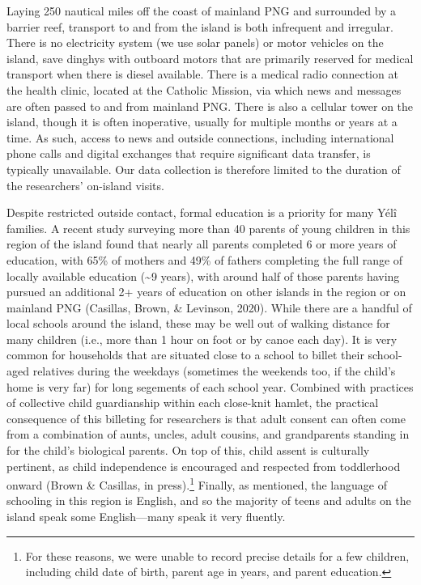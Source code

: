 \documentclass[english,,man,floatsintext]{apa6}
\begin{document}
Laying 250 nautical miles off the coast of mainland PNG and surrounded
by a barrier reef, transport to and from the island is both infrequent
and irregular. There is no electricity system (we use solar panels) or
motor vehicles on the island, save dinghys with outboard motors that are
primarily reserved for medical transport when there is diesel available.
There is a medical radio connection at the health clinic, located at the
Catholic Mission, via which news and messages are often passed to and
from mainland PNG. There is also a cellular tower on the island, though
it is often inoperative, usually for multiple months or years at a time.
As such, access to news and outside connections, including international
phone calls and digital exchanges that require significant data
transfer, is typically unavailable. Our data collection is therefore
limited to the duration of the researchers' on-island visits.

Despite restricted outside contact, formal education is a priority for
many Yélî families. A recent study surveying more than 40 parents of
young children in this region of the island found that nearly all
parents completed 6 or more years of education, with 65\% of mothers and
49\% of fathers completing the full range of locally available education
(\textasciitilde{}9 years), with around half of those parents having
pursued an additional 2+ years of education on other islands in the
region or on mainland PNG (Casillas, Brown, \& Levinson, 2020). While
there are a handful of local schools around the island, these may be
well out of walking distance for many children (i.e., more than 1 hour
on foot or by canoe each day). It is very common for households that are
situated close to a school to billet their school-aged relatives during
the weekdays (sometimes the weekends too, if the child's home is very
far) for long segements of each school year. Combined with practices of
collective child guardianship within each close-knit hamlet, the
practical consequence of this billeting for researchers is that adult
consent can often come from a combination of aunts, uncles, adult
cousins, and grandparents standing in for the child's biological
parents. On top of this, child assent is culturally pertinent, as child
independence is encouraged and respected from toddlerhood onward (Brown
\& Casillas, in press).\footnote{For these reasons, we were unable to
  record precise details for a few children, including child date of
  birth, parent age in years, and parent education.} Finally, as
mentioned, the language of schooling in this region is English, and so
the majority of teens and adults on the island speak some English---many
speak it very fluently.
\end{document}
